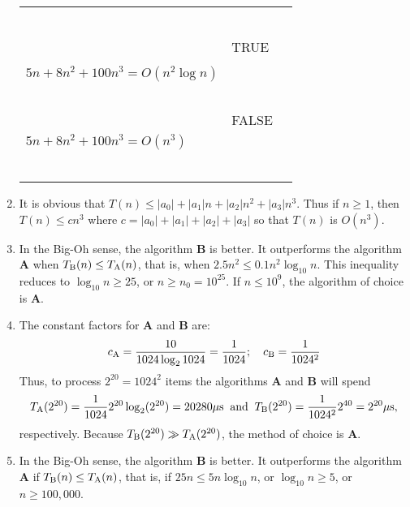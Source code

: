 \documentclass[]{article}
\begin{document}
\begin{enumerate}
\begin{tabular}{|l|l|l|}
\begin{minipage}{40mm}
$5n + 8n^{2} + 100n^{3} = O(n^{4})$\\
~~~ \\
\end{minipage}                &  TRUE    &  \\ \hline
\begin{minipage}{40mm}~~\\
$5n + 8n^{2} + 100n^{3} = O(n^{2} \log n)$\\
~~~\\
\end{minipage}                & FALSE     &  
\begin{minipage}{40mm}~~\\
$5n + 8n^{2} + 100n^{3} = O(n^{3})$\\
~~~\\
\end{minipage}\\ \hline
\end{tabular}

\item
It is obvious that
$T(n) \le |a_{0}|+|a_{1}|n +|a_{2}|n^{2}+|a_{3}|n^{3}$.
Thus if $n \ge 1$, then
$T(n) \le cn^{3}$ where $c = |a_{0}|+|a_{1}|+ |a_{2}|+ |a_{3}|$
so that $T(n)$ is $O(n^{3})$.

\item In the Big-Oh sense, the algorithm \textbf{B} is better. It 
outperforms the algorithm \textbf{A} when $T_{\rm B}(n) \le T_{\rm A}(n)$,
that is, when $2.5n^{2} \le 0.1 n^{2}\log_{10}n$. This inequality
reduces to
$\log_{10} n \ge 25$, or $n \ge n_{0}=10^{25}$. If
$n \le 10^{9}$, the algorithm of choice is \textbf{A}.

\item The constant factors for {\bf A} and {\bf B} are: 
\[
c_{\rm A}=\frac{10}{1024 \log_{2}1024} = \frac{1}{1024}; \quad
c_{\rm B}=\frac{1}{1024^2}
\]
Thus, to process \(2^{20}=1024^2\) items the algorithms
{\bf A} and {\bf B} will spend
\[
T_{\rm A}(2^{20}) = \frac{1}{1024}2^{20}\log_{2}(2^{20}) =
20280 \mu\mathrm{s}\;\;\mathrm{and}\;\;
T_{\rm B}(2^{20}) = \frac{1}{1024^{2}}2^{40} = 2^{20} \mu\mathrm{s},
\] 
respectively.
Because \(T_{\rm B}(2^{20}) \gg T_{\rm A}(2^{20})\), the method
of choice is {\bf A}.

\item In the Big-Oh sense, the algorithm \textbf{B} is better. It 
outperforms the algorithm \textbf{A} if $T_{\rm B}(n) \le T_{\rm A}(n)$,
that is, if $25n \le 5n\log_{10}n$, or
$\log_{10} n \ge 5$, or $n \ge 100,000$.


\end{enumerate}
\end{document}
